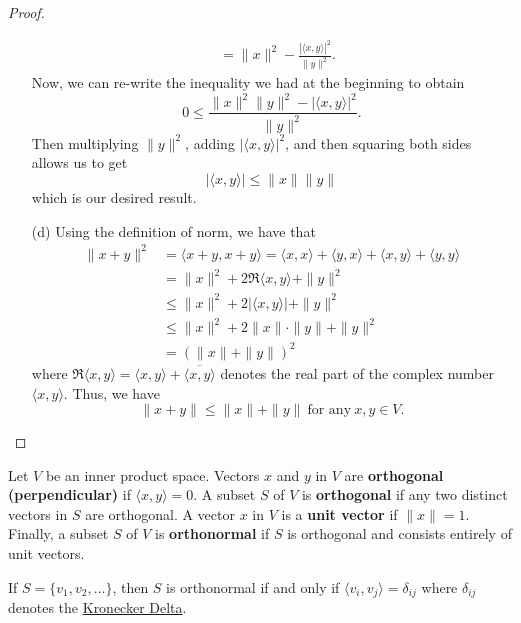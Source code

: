 \begin{proof}
\begin{enumerate}
\begin{align*}
                             &= \|x\|^{2} - \frac{ | \langle x , y \rangle |^{2} }{ \|y\|^{2} }.
        \end{align*}
        Now, we can re-write the inequality we had at the beginning to obtain
        \[  0 \leq \frac{ \|x\|^{2} \|y\|^{2} - | \langle x , y \rangle |^{2}  }{ \|y\|^{2} }.    \]
        Then multiplying \( \|y\|^{2} \), adding \( | \langle x , y \rangle |^{2} \), and then squaring both sides allows us to get
        \[  | \langle x , y \rangle | \leq \|x\| \|y\|  \]
        which is our desired result.
    \item[(d)] Using the definition of norm, we have that
        \begin{align*}
            \|x + y\|^{2} &= \langle  x + y  ,  x + y \rangle = \langle x , x \rangle + \langle y , x \rangle + \langle x , y \rangle + \langle y , y \rangle \\
                          &=  \|x\|^{2} + 2 \Re\langle x , y \rangle + \|y\|^{2} \\
                          &\leq \|x\|^{2} + 2 | \langle x , y \rangle | + \|y\|^{2} \\ \tag{Part (c)}
                          &\leq \|x\|^{2} + 2 \|x\| \cdot \|y\| + \|y\|^{2} \\
                          &= (\|x\| + \|y\|)^{2} 
        \end{align*}
        where \( \Re \langle x , y \rangle = \langle x , y \rangle + \overline{\langle x , y \rangle}   \) denotes the real part of the complex number \( \langle x , y \rangle \). Thus, we have 
        \[  \|x + y\| \leq \|x\| + \|y\| \ \text{for any} \ x,y \in V.    \]
\end{enumerate}
\end{proof}

\begin{definition}
   Let \( V  \) be an inner product space. Vectors \( x  \) and \( y  \) in \( V  \) are \textbf{orthogonal (perpendicular)} if \( \langle x , y \rangle = 0  \). A subset \( S  \) of \( V  \) is \textbf{orthogonal} if any two distinct vectors in \( S  \) are orthogonal. A vector \( x  \) in \( V  \) is a \textbf{unit vector} if \( \| x \| = 1  \). Finally, a subset \( S  \) of \( V  \) is \textbf{orthonormal} if \( S  \) is orthogonal and consists entirely of unit vectors.  
\end{definition}

If \( S = \{ {v}_{1}, {v}_{2}, \dots  \}  \), then \( S  \) is orthonormal if and only if \( \langle {v}_{i} ,  {v}_{j} \rangle = {\delta}_{ij} \) where \( {\delta}_{ij}  \) denotes the {\hyperref[Kronecker Delta]{Kronecker Delta}}.

